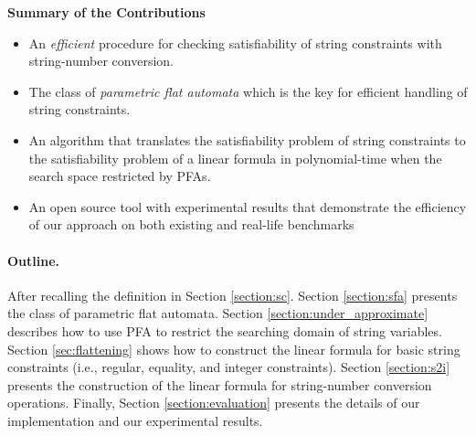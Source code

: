 \documentclass[sigplan,review,anonymous]{acmart}\settopmatter{printfolios=true,printccs=false,printacmref=false}
\begin{document}
\smallskip

\noindent
{\bf Summary of the Contributions}

\begin{itemize}

\item An {\em efficient} procedure for checking satisfiability
of string constraints with string-number conversion.



\item The class of \emph{parametric flat automata} which is the key for efficient handling of string constraints.

\item An algorithm that translates the satisfiability problem of string constraints to the satisfiability problem of a linear formula  in polynomial-time when  the search space restricted by PFAs.


\item An open source tool with experimental
results that demonstrate the efficiency of
our approach on both existing and real-life benchmarks
\end{itemize}


\paragraph{Outline.}
After recalling the  definition in Section \ref{section:sc}. 
Section \ref{section:sfa} presents  the class of parametric flat automata. 
Section \ref{section:under_approximate} describes how to use PFA to restrict the searching domain of string variables.
Section \ref{sec:flattening} shows how to construct the linear formula for  basic string constraints (i.e., 
regular, equality, and integer constraints). 
 Section \ref{section:s2i} presents the construction of the linear formula for string-number conversion operations. Finally, Section \ref{section:evaluation} presents the details of our implementation and our experimental results.
 
\end{document}
